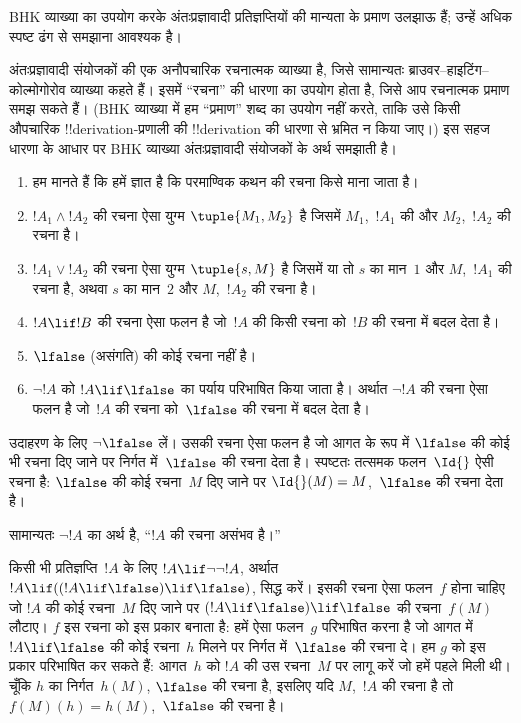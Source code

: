 \documentclass[../../../include/open-logic-section]{subfiles}
\begin{document}


\begin{editorial}
  BHK व्याख्या का उपयोग करके अंतःप्रज्ञावादी प्रतिज्ञप्तियों की मान्यता के
  प्रमाण उलझाऊ हैं; उन्हें अधिक स्पष्ट ढंग से समझाना आवश्यक है।
\end{editorial}

अंतःप्रज्ञावादी संयोजकों की एक अनौपचारिक रचनात्मक व्याख्या है, जिसे सामान्यतः
ब्राउवर--हाइटिंग--कोल्मोगोरोव व्याख्या कहते हैं। इसमें ``रचना'' की धारणा का
उपयोग होता है, जिसे आप रचनात्मक प्रमाण समझ सकते हैं। (BHK व्याख्या में हम
``प्रमाण'' शब्द का उपयोग नहीं करते, ताकि उसे किसी औपचारिक
!!{derivation}-प्रणाली की !!{derivation} की धारणा से भ्रमित न किया जाए।)
इस सहज धारणा के आधार पर BHK व्याख्या अंतःप्रज्ञावादी संयोजकों के अर्थ समझाती
है।

\begin{enumerate}
\item हम मानते हैं कि हमें ज्ञात है कि परमाण्विक कथन की रचना किसे माना जाता
  है।
\item $!A_1 \land !A_2$ की रचना ऐसा युग्म $\tuple{M_1, M_2}$ है जिसमें
  $M_1$,~$!A_1$ की और $M_2$,~$!A_2$ की रचना है।
\item $!A_1 \lor !A_2$ की रचना ऐसा युग्म $\tuple{s, M}$ है जिसमें या तो
  $s$ का मान~$1$ और $M$,~$!A_1$ की रचना है, अथवा $s$ का मान~$2$ और
  $M$,~$!A_2$ की रचना है।
\item $!A \lif !B$ की रचना ऐसा फलन है जो~$!A$ की किसी रचना को~$!B$ की रचना
  में बदल देता है।
\item $\lfalse$ (असंगति) की कोई रचना नहीं है।
\item $\lnot !A$ को $!A \lif \lfalse$ का पर्याय परिभाषित किया जाता है।
  अर्थात $\lnot !A$ की रचना ऐसा फलन है जो~$!A$ की रचना को~$\lfalse$ की
  रचना में बदल देता है।
\end{enumerate}

\begin{ex}
उदाहरण के लिए $\lnot \lfalse$ लें। उसकी रचना ऐसा फलन है जो आगत के रूप में
$\lfalse$ की कोई भी रचना दिए जाने पर निर्गत में~$\lfalse$ की रचना देता है।
स्पष्टतः तत्समक फलन~$\Id{}$ ऐसी रचना है: $\lfalse$ की कोई रचना~$M$ दिए
जाने पर $\Id{}(M) = M$,~$\lfalse$ की रचना देता है।
\end{ex}

सामान्यतः $\lnot !A$ का अर्थ है, ``$!A$ की रचना असंभव है।''

\begin{ex}
किसी भी प्रतिज्ञप्ति~$!A$ के लिए $!A \lif \lnot \lnot !A$, अर्थात
$!A \lif ((!A \lif \lfalse) \lif \lfalse)$, सिद्ध करें। इसकी रचना ऐसा
फलन~$f$ होना चाहिए जो $!A$ की कोई रचना~$M$ दिए जाने पर
$(!A \lif \lfalse) \lif \lfalse$ की रचना~$f(M)$ लौटाए। $f$ इस रचना को
इस प्रकार बनाता है: हमें ऐसा फलन~$g$ परिभाषित करना है जो आगत में
$!A \lif \lfalse$ की कोई रचना~$h$ मिलने पर निर्गत में~$\lfalse$ की रचना
दे। हम $g$ को इस प्रकार परिभाषित कर सकते हैं: आगत~$h$ को $!A$ की उस
रचना~$M$ पर लागू करें जो हमें पहले मिली थी। चूँकि $h$ का निर्गत~$h(M)$,
$\lfalse$ की रचना है, इसलिए यदि $M$,~$!A$ की रचना है तो
$f(M)(h) = h(M)$,~$\lfalse$ की रचना है।
\end{ex}
\end{document}
